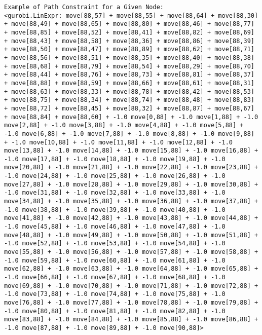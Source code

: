 \documentclass[11pt]{article}
\begin{document}
    \begin{Verbatim}[commandchars=\\\{\}]
Example of Path Constraint for a Given Node:
<gurobi.LinExpr: move[88,57] + move[88,55] + move[88,64] + move[88,30] + move[88,49] + move[88,65] + move[88,80] + move[88,46] + move[88,77] + move[88,85] + move[88,52] + move[88,41] + move[88,82] + move[88,69] + move[88,43] + move[88,58] + move[88,36] + move[88,86] + move[88,39] + move[88,50] + move[88,47] + move[88,89] + move[88,62] + move[88,71] + move[88,56] + move[88,51] + move[88,35] + move[88,40] + move[88,38] + move[88,68] + move[88,79] + move[88,54] + move[88,29] + move[88,70] + move[88,44] + move[88,76] + move[88,73] + move[88,81] + move[88,37] + move[88,88] + move[88,59] + move[88,66] + move[88,61] + move[88,31] + move[88,63] + move[88,33] + move[88,78] + move[88,42] + move[88,53] + move[88,75] + move[88,34] + move[88,74] + move[88,48] + move[88,83] + move[88,72] + move[88,45] + move[88,32] + move[88,87] + move[88,67] + move[88,84] + move[88,60] + -1.0 move[0,88] + -1.0 move[1,88] + -1.0 move[2,88] + -1.0 move[3,88] + -1.0 move[4,88] + -1.0 move[5,88] + -1.0 move[6,88] + -1.0 move[7,88] + -1.0 move[8,88] + -1.0 move[9,88] + -1.0 move[10,88] + -1.0 move[11,88] + -1.0 move[12,88] + -1.0 move[13,88] + -1.0 move[14,88] + -1.0 move[15,88] + -1.0 move[16,88] + -1.0 move[17,88] + -1.0 move[18,88] + -1.0 move[19,88] + -1.0 move[20,88] + -1.0 move[21,88] + -1.0 move[22,88] + -1.0 move[23,88] + -1.0 move[24,88] + -1.0 move[25,88] + -1.0 move[26,88] + -1.0 move[27,88] + -1.0 move[28,88] + -1.0 move[29,88] + -1.0 move[30,88] + -1.0 move[31,88] + -1.0 move[32,88] + -1.0 move[33,88] + -1.0 move[34,88] + -1.0 move[35,88] + -1.0 move[36,88] + -1.0 move[37,88] + -1.0 move[38,88] + -1.0 move[39,88] + -1.0 move[40,88] + -1.0 move[41,88] + -1.0 move[42,88] + -1.0 move[43,88] + -1.0 move[44,88] + -1.0 move[45,88] + -1.0 move[46,88] + -1.0 move[47,88] + -1.0 move[48,88] + -1.0 move[49,88] + -1.0 move[50,88] + -1.0 move[51,88] + -1.0 move[52,88] + -1.0 move[53,88] + -1.0 move[54,88] + -1.0 move[55,88] + -1.0 move[56,88] + -1.0 move[57,88] + -1.0 move[58,88] + -1.0 move[59,88] + -1.0 move[60,88] + -1.0 move[61,88] + -1.0 move[62,88] + -1.0 move[63,88] + -1.0 move[64,88] + -1.0 move[65,88] + -1.0 move[66,88] + -1.0 move[67,88] + -1.0 move[68,88] + -1.0 move[69,88] + -1.0 move[70,88] + -1.0 move[71,88] + -1.0 move[72,88] + -1.0 move[73,88] + -1.0 move[74,88] + -1.0 move[75,88] + -1.0 move[76,88] + -1.0 move[77,88] + -1.0 move[78,88] + -1.0 move[79,88] + -1.0 move[80,88] + -1.0 move[81,88] + -1.0 move[82,88] + -1.0 move[83,88] + -1.0 move[84,88] + -1.0 move[85,88] + -1.0 move[86,88] + -1.0 move[87,88] + -1.0 move[89,88] + -1.0 move[90,88]>

    \end{Verbatim}
\end{document}

